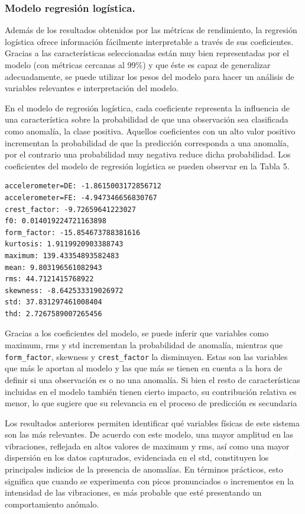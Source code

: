 \documentclass[11pt,a4paper,spanish]{book}
\numberwithin{equation}{chapter}
\numberwithin{figure}{chapter}
\begin{document}
\subsubsection{Modelo regresión logística.}

Además de los resultados obtenidos por las métricas de rendimiento, la regresión logística ofrece información fácilmente interpretable a través de sus coeficientes. Gracias a las características seleccionadas están muy bien representadas por el modelo (con métricas cercanas al 99\%) y que éste es capaz de generalizar adecuadamente, se puede utilizar los pesos del modelo para hacer un análisis de variables relevantes e interpretación del modelo.  


En el modelo de regresión logística, cada coeficiente representa la influencia de una característica sobre la probabilidad de que una observación sea clasificada como anomalía, la clase positiva. Aquellos coeficientes con un alto valor positivo incrementan la probabilidad de que la predicción corresponda a una anomalía, por el contrario una probabilidad muy negativa reduce dicha probabilidad. Los coeficientes del modelo de regresión logística se pueden observar en la Tabla 5. 


\vspace{5mm}
\begin{lstlisting}[language={}, basicstyle=\ttfamily\footnotesize\color{black}, frame=lines]
accelerometer=DE: -1.8615003172856712
accelerometer=FE: -4.947346656830767
crest_factor: -9.72659641223027
f0: 0.014019224721163898
form_factor: -15.854673788381616
kurtosis: 1.9119920903388743
maximum: 139.43354893582483
mean: 9.803196561082943
rms: 44.7121415768922
skewness: -8.642533319026972
std: 37.831297461008404
thd: 2.7267589007265456
\end{lstlisting}


Gracias a los coeficientes del modelo, se puede inferir que variables como maximum, rms y std incrementan la probabilidad de anomalía, mientras que \lstinline|form_factor|, skewness y \lstinline|crest_factor| la disminuyen. 
Estas son las variables que más le aportan al modelo y las que más se tienen en cuenta a la hora de definir si una observación es o no una anomalía. Si bien el resto de características incluidas en el modelo también tienen cierto impacto, su contribución relativa es menor, lo que sugiere que su relevancia en el proceso de predicción es secundaria


Los resultados anteriores permiten identificar qué variables físicas de este sistema son las más relevantes. De acuerdo con este modelo, una mayor amplitud en las vibraciones, reflejada en altos valores de maximum y rms, así como una mayor dispersión en los datos capturados, evidenciada en el std, constituyen los principales indicios de la presencia de anomalías. En términos prácticos, esto significa que cuando se experimenta con picos pronunciados o incrementos en la intensidad de las vibraciones, es más probable que esté presentando un comportamiento anómalo.
\end{document}
